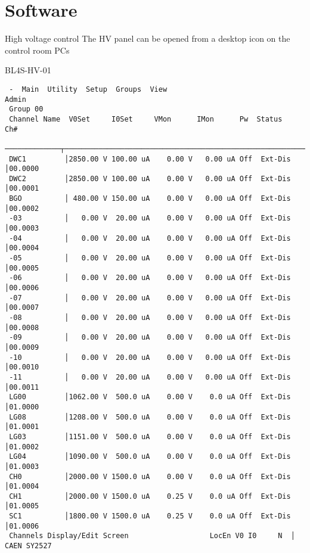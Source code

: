 \documentclass[9pt]{beamer}
\newenvironment{terminalblock}[1]{%
  \setbeamercolor{block body}{bg=black, fg=white}
  \begin{block}{#1}}{\end{block}}
\begin{document}
\section{Software}
\begin{frame}[fragile]{High voltage control}
The HV panel can be opened from a desktop icon on the control room PCs
\begin{terminalblock}{BL4S-HV-01}
\tiny
\vspace*{-0.5cm}
\begin{verbatim}
 -  Main  Utility  Setup  Groups  View                                    Admin 
 Group 00                                                                       
 Channel Name  V0Set     I0Set     VMon      IMon      Pw  Status           Ch# 
 ─────────────┬─────────────────────────────────────────────────────────┬────────
 DWC1         │2850.00 V 100.00 uA    0.00 V   0.00 uA Off  Ext-Dis     │00.0000 
 DWC2         │2850.00 V 100.00 uA    0.00 V   0.00 uA Off  Ext-Dis     │00.0001 
 BGO          │ 480.00 V 150.00 uA    0.00 V   0.00 uA Off  Ext-Dis     │00.0002 
 -03          │   0.00 V  20.00 uA    0.00 V   0.00 uA Off  Ext-Dis     │00.0003 
 -04          │   0.00 V  20.00 uA    0.00 V   0.00 uA Off  Ext-Dis     │00.0004 
 -05          │   0.00 V  20.00 uA    0.00 V   0.00 uA Off  Ext-Dis     │00.0005 
 -06          │   0.00 V  20.00 uA    0.00 V   0.00 uA Off  Ext-Dis     │00.0006 
 -07          │   0.00 V  20.00 uA    0.00 V   0.00 uA Off  Ext-Dis     │00.0007 
 -08          │   0.00 V  20.00 uA    0.00 V   0.00 uA Off  Ext-Dis     │00.0008 
 -09          │   0.00 V  20.00 uA    0.00 V   0.00 uA Off  Ext-Dis     │00.0009 
 -10          │   0.00 V  20.00 uA    0.00 V   0.00 uA Off  Ext-Dis     │00.0010 
 -11          │   0.00 V  20.00 uA    0.00 V   0.00 uA Off  Ext-Dis     │00.0011 
 LG00         │1062.00 V  500.0 uA    0.00 V    0.0 uA Off  Ext-Dis     │01.0000 
 LG08         │1208.00 V  500.0 uA    0.00 V    0.0 uA Off  Ext-Dis     │01.0001 
 LG03         │1151.00 V  500.0 uA    0.00 V    0.0 uA Off  Ext-Dis     │01.0002 
 LG04         │1090.00 V  500.0 uA    0.00 V    0.0 uA Off  Ext-Dis     │01.0003 
 CH0          │2000.00 V 1500.0 uA    0.00 V    0.0 uA Off  Ext-Dis     │01.0004 
 CH1          │2000.00 V 1500.0 uA    0.25 V    0.0 uA Off  Ext-Dis     │01.0005 
 SC1          │1800.00 V 1500.0 uA    0.25 V    0.0 uA Off  Ext-Dis     │01.0006 
 Channels Display/Edit Screen                   LocEn V0 I0     N  │ CAEN SY2527 
\end{verbatim}
\end{terminalblock}
\end{frame}
\end{document}
